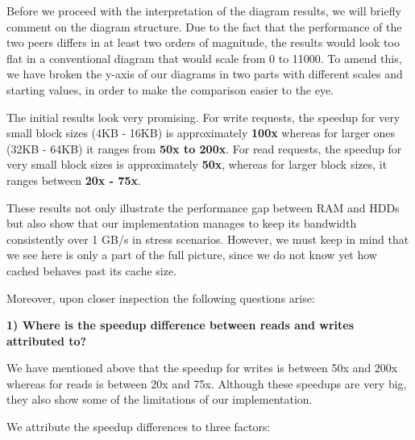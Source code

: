Before we proceed with the interpretation of the diagram results, we will 
briefly comment on the diagram structure. Due to the fact that the performance 
of the two peers differs in at least two orders of magnitude, the results would 
look too flat in a conventional diagram that would scale from 0 to 11000. To 
amend this, we have broken the y-axis of our diagrams in two parts with 
different scales and starting values, in order to make the comparison easier to 
the eye.


The initial results look very promising. For write requests, the speedup for 
very small block sizes (4KB - 16KB) is approximately \textbf{100x} whereas for 
larger ones (32KB - 64KB) it ranges from \textbf{50x to 200x}. For read 
requests, the speedup for very small block sizes is approximately \textbf{50x}, 
whereas for larger block sizes, it ranges between \textbf{20x - 75x}.

These results not only illustrate the performance gap between RAM and
HDDs but also show that our implementation manages to keep its bandwidth 
consistently over 1 GB/s in stress scenarios. However, we must keep in mind 
that we see here is only a part of the full picture, since we do not know yet 
how cached behaves past its cache size.

Moreover, upon closer inspection the following questions arise:

\textbf{1) Where is the speedup difference between reads and writes attributed 
	to?}

We have mentioned above that the speedup for writes is between 50x and 200x 
whereas for reads is between 20x and 75x. Although these speedups are very big, 
they also show some of the limitations of our implementation.

We attribute the speedup differences to three factors:

